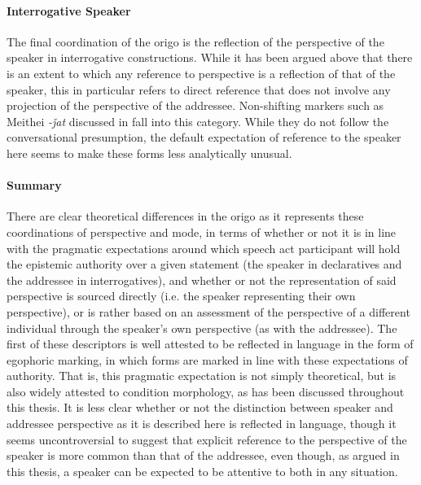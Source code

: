 \paragraph{Interrogative Speaker}
The final coordination of the origo is the reflection of the perspective of the speaker in interrogative constructions. While it has been argued above that there is an extent to which any reference to perspective is a reflection of that of the speaker, this in particular refers to direct reference that does not involve any projection of the perspective of the addressee. Non-shifting markers such as Meithei \textit{-ǰat} discussed in  fall into this category. While they do not follow the conversational presumption, the default expectation of reference to the speaker here seems to make these forms less analytically unusual.

\paragraph{Summary}
There are clear theoretical differences in the origo as it represents these coordinations of perspective and mode, in terms of whether or not it is in line with the pragmatic expectations around which speech act participant will hold the epistemic authority over a given statement (the speaker in declaratives and the addressee in interrogatives), and whether or not the representation of said perspective is sourced directly (i.e. the speaker representing their own perspective), or is rather based on an assessment of the perspective of a different individual through the speaker's own perspective (as with the addressee). The first of these descriptors is well attested to be reflected in language in the form of egophoric marking, in which forms are marked in line with these expectations of authority. That is, this pragmatic expectation is not simply theoretical, but is also widely attested to condition morphology, as has been discussed throughout this thesis. It is less clear whether or not the distinction between speaker and addressee perspective as it is described here is reflected in language, though it seems uncontroversial to suggest that explicit reference to the perspective of the speaker is more common than that of the addressee, even though, as argued in this thesis, a speaker can be expected to be attentive to both in any situation. 

